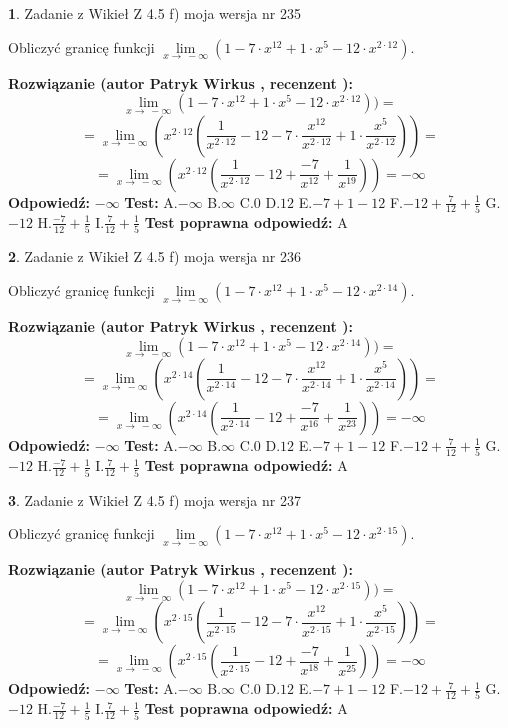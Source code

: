 \documentclass[12pt, a4paper]{article}
\theoremstyle{definition} %
\newtheorem{zad}{}
\newcommand{\zadStart}[1]{\begin{zad}#1\newline}
\newcommand{\zadStop}{\end{zad}}
\newcommand{\rozwStart}[2]{\noindent \textbf{Rozwiązanie (autor #1 , recenzent #2): }\newline}
\newcommand{\rozwStop}{\newline}
\newcommand{\odpStart}{\noindent \textbf{Odpowiedź:}\newline}
\newcommand{\odpStop}{\newline}
\newcommand{\testStart}{\noindent \textbf{Test:}\newline}
\newcommand{\testStop}{\newline}
\newcommand{\kluczStart}{\noindent \textbf{Test poprawna odpowiedź:}\newline}
\newcommand{\kluczStop}{\newline}
\begin{document}
\zadStart{Zadanie z Wikieł Z 4.5 f) moja wersja nr 235}



Obliczyć granicę funkcji  $\lim\limits_{x\to\ -\infty}(1 - 7 \cdot x^{12}+1 \cdot x^{5}- 12 \cdot x^{2\cdot12})$.
\zadStop
\rozwStart{Patryk Wirkus}{}
$$\lim\limits_{x\to\ -\infty}(1 - 7 \cdot x^{12}+1 \cdot x^{5}- 12 \cdot x^{2\cdot12}))=$$
$$=\lim\limits_{x\to\ -\infty}(x^{2\cdot12}(\frac{1}{x^{2\cdot12}}-12 -7 \cdot \frac{x^{12}}{x^{2\cdot12}}+1 \cdot \frac{x^{5}}{x^{2\cdot12}}))=$$
$$=\lim\limits_{x\to\ -\infty}(x^{2\cdot12}(\frac{1}{x^{2\cdot12}}-12 + \frac{-7}{x^{12}}+ \frac{1}{x^{19}}))=-\infty$$
\rozwStop
\odpStart
$-\infty$
\odpStop
\testStart
A.$-\infty$ B.$\infty$ C.$0$ D.$12$ E.$-7 + 1 - 12$
F.$-12+\frac{7}{12}+\frac{1}{5}$ G.$-12$
H.$\frac{-7}{12}+\frac{1}{5}$
I.$\frac{7}{12}+\frac{1}{5}$
\testStop
\kluczStart
A
\kluczStop



\zadStart{Zadanie z Wikieł Z 4.5 f) moja wersja nr 236}



Obliczyć granicę funkcji  $\lim\limits_{x\to\ -\infty}(1 - 7 \cdot x^{12}+1 \cdot x^{5}- 12 \cdot x^{2\cdot14})$.
\zadStop
\rozwStart{Patryk Wirkus}{}
$$\lim\limits_{x\to\ -\infty}(1 - 7 \cdot x^{12}+1 \cdot x^{5}- 12 \cdot x^{2\cdot14}))=$$
$$=\lim\limits_{x\to\ -\infty}(x^{2\cdot14}(\frac{1}{x^{2\cdot14}}-12 -7 \cdot \frac{x^{12}}{x^{2\cdot14}}+1 \cdot \frac{x^{5}}{x^{2\cdot14}}))=$$
$$=\lim\limits_{x\to\ -\infty}(x^{2\cdot14}(\frac{1}{x^{2\cdot14}}-12 + \frac{-7}{x^{16}}+ \frac{1}{x^{23}}))=-\infty$$
\rozwStop
\odpStart
$-\infty$
\odpStop
\testStart
A.$-\infty$ B.$\infty$ C.$0$ D.$12$ E.$-7 + 1 - 12$
F.$-12+\frac{7}{12}+\frac{1}{5}$ G.$-12$
H.$\frac{-7}{12}+\frac{1}{5}$
I.$\frac{7}{12}+\frac{1}{5}$
\testStop
\kluczStart
A
\kluczStop



\zadStart{Zadanie z Wikieł Z 4.5 f) moja wersja nr 237}



Obliczyć granicę funkcji  $\lim\limits_{x\to\ -\infty}(1 - 7 \cdot x^{12}+1 \cdot x^{5}- 12 \cdot x^{2\cdot15})$.
\zadStop
\rozwStart{Patryk Wirkus}{}
$$\lim\limits_{x\to\ -\infty}(1 - 7 \cdot x^{12}+1 \cdot x^{5}- 12 \cdot x^{2\cdot15}))=$$
$$=\lim\limits_{x\to\ -\infty}(x^{2\cdot15}(\frac{1}{x^{2\cdot15}}-12 -7 \cdot \frac{x^{12}}{x^{2\cdot15}}+1 \cdot \frac{x^{5}}{x^{2\cdot15}}))=$$
$$=\lim\limits_{x\to\ -\infty}(x^{2\cdot15}(\frac{1}{x^{2\cdot15}}-12 + \frac{-7}{x^{18}}+ \frac{1}{x^{25}}))=-\infty$$
\rozwStop
\odpStart
$-\infty$
\odpStop
\testStart
A.$-\infty$ B.$\infty$ C.$0$ D.$12$ E.$-7 + 1 - 12$
F.$-12+\frac{7}{12}+\frac{1}{5}$ G.$-12$
H.$\frac{-7}{12}+\frac{1}{5}$
I.$\frac{7}{12}+\frac{1}{5}$
\testStop
\kluczStart
A
\kluczStop
\end{document}
